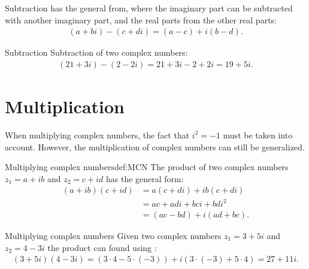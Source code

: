 \noindent 
Subtraction has the general from, where the imaginary part can be subtracted with another imaginary part, and the real parts from the other real parts:
\begin{align*}
(a + bi) - (c + di) = (a - c) + i(b - d).
\end{align*}

\begin{example}{Subtraction}{}
Subtraction of two complex numbers:
\begin{align*}
(21 + 3i) - (2 - 2i) = 21 + 3i - 2 + 2i = 19 + 5i.
\end{align*}
\end{example}

\section{Multiplication}
When multiplying complex numbers, the fact that $i^2 =-1$ must be taken into account. However, the multiplication of complex numbers can still be generalized. 
\begin{definition}{Multiplying complex numbers}{def:MCN}
The product of two complex numbers $z_1=a+ib$ and $z_2=c+id$ has the general form:
\begin{align*}
(a+ib)(c+id)&=a(c+di)+ib(c+di)
\\
&=ac+adi+bci+bdi^2
\\
&=(ac-bd)+i(ad+bc).
\end{align*}
\end{definition}
\begin{example}{Multiplying complex numbers}{}
Given two complex numbers $z_1=3+5i$ and $z_2=4-3i$ the product can found using :
\begin{align*}
(3+5i)(4-3i) = (3\cdot4-5\cdot(-3))+i(3\cdot(-3)+5\cdot4)=27+11i.
\end{align*}
\end{example}


